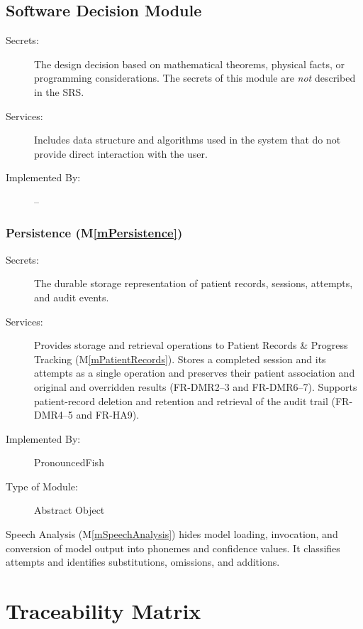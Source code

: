 \documentclass[12pt, titlepage]{article}
\newcommand{\mref}[1]{M\ref{#1}}
\begin{document}
\subsection{Software Decision Module}

\begin{description}
\item[Secrets:] The design decision based on mathematical theorems, physical
  facts, or programming considerations. The secrets of this module are
  \emph{not} described in the SRS.
\item[Services:] Includes data structure and algorithms used in the system that
  do not provide direct interaction with the user. 
\item[Implemented By:] --
\end{description}

\subsubsection{Persistence (\mref{mPersistence})}

\begin{description}
\item[Secrets:] The durable storage representation of patient records,
sessions, attempts, and audit events.
\item[Services:] Provides storage and retrieval operations to Patient Records
\& Progress Tracking (\mref{mPatientRecords}). Stores a completed session
and its attempts as a single operation and preserves their patient association
and original and overridden results (FR-DMR2--3 and FR-DMR6--7). Supports
patient-record deletion and retention and retrieval of the audit trail
(FR-DMR4--5 and FR-HA9).
\item[Implemented By:] PronouncedFish
\item[Type of Module:] Abstract Object
\end{description}

Speech Analysis (\mref{mSpeechAnalysis}) hides model loading, invocation,
and conversion of model output into phonemes and confidence values. It
classifies attempts and identifies substitutions, omissions, and additions.

\section{Traceability Matrix} \label{SecTM}
\end{document}
